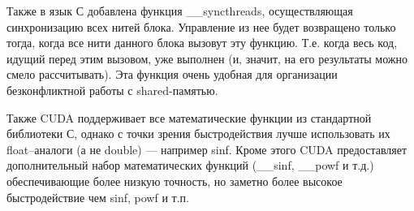 Также в язык С добавлена функция \_\_syncthreads, осуществляющая синхронизацию всех нитей блока. Управление из нее будет возвращено только тогда, когда все нити данного блока вызовут эту функцию. Т.е. когда весь код, идущий перед этим вызовом, уже выполнен (и, значит, на его результаты можно смело рассчитывать). Эта функция очень удобная для организации безконфликтной работы с shared-памятью.

Также CUDA поддерживает все математические функции из стандартной библиотеки С, однако с точки зрения быстродействия лучше использовать их float--аналоги (а не double) --- например sinf. Кроме этого CUDA предоставляет дополнительный набор математических функций (\_\_sinf, \_\_powf и т.д.) обеспечивающие более низкую точность, но заметно более высокое быстродействие чем sinf, powf и т.п. \cite{cudawiki}